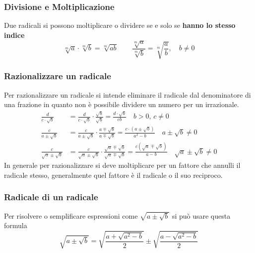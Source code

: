 \subsubsection{Divisione e Moltiplicazione}
Due radicali si possono moltiplicare o dividere se e solo se \textbf{hanno lo stesso indice}
\begin{equation*}
\sqrt[m]{a}\cdot\sqrt[m]{b} = \sqrt[m]{ab}\qquad\frac{\sqrt[m]{a}}{\sqrt[m]{b}} = \sqrt[m]{\frac{a}{b}}
,\quad b \neq 0
\end{equation*}

\subsubsection{Razionalizzare un radicale}
Per razionalizzare un radicale si intende eliminare il radicale dal denominatore di una frazione in
quanto non è possibile dividere un numero per un irrazionale.
\begin{align*}
\frac{d}{c\cdot\sqrt{b}} & = \frac{d}{c\cdot\sqrt{b}}\cdot\frac{\sqrt{b}}{\sqrt{b}} = 
\frac{d\cdot\sqrt{b}}{cb} \quad b > 0,\, c \neq 0 \\
\frac{c}{a\pm\sqrt{b}} &= \frac{c}{a\pm\sqrt{b}}\cdot\frac{a\mp\sqrt{b}}{a\mp\sqrt{b}} = 
\frac{c\cdot(a\pm\sqrt{b})}{a^2-b} \quad a\pm\sqrt{b} \neq 0 \\
\frac{c}{\sqrt{a}\pm\sqrt{b}} &=
\frac{c}{\sqrt{a}\pm\sqrt{b}}\cdot\frac{\sqrt{a}\mp\sqrt{b}}{\sqrt{a}\mp\sqrt{b}} =
\frac{c(\sqrt{a}\mp\sqrt{b})}{a-b} \quad \sqrt{a}\pm\sqrt{b} \neq 0
\end{align*}
In generale per razionalizzare si deve moltiplicare per un fattore che annulli il radicale stesso, 
generalmente quel fattore è il radicale o il suo reciproco.

\subsubsection{Radicale di un radicale}
Per risolvere o semplificare espressioni come $\sqrt{a\pm\sqrt{b}}$ si può usare questa formula
\begin{equation*}
\sqrt{a\pm\sqrt{b}} = \sqrt{\frac{a+\sqrt{a^2-b}}{2}}\pm\sqrt{\frac{a-\sqrt{a^2-b}}{2}}
\end{equation*}

